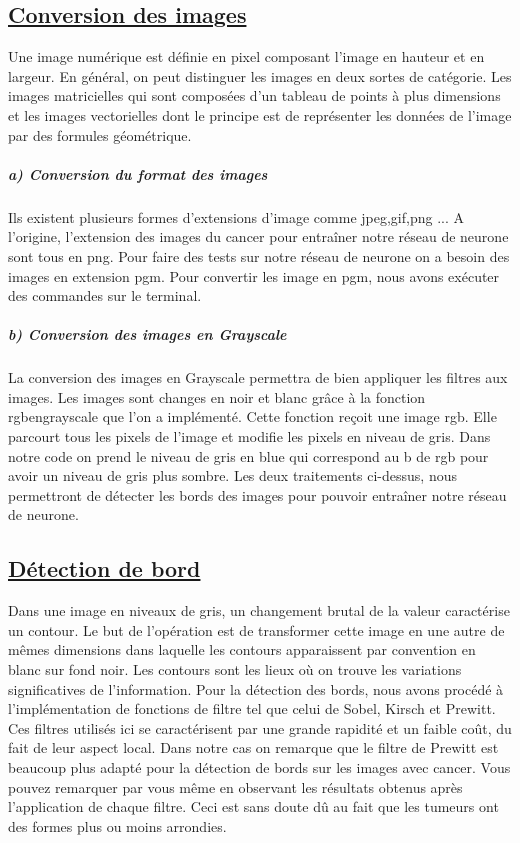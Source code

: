 \documentclass[11pt]{article}
\begin{document}
\subsection{\underline{Conversion des images}}

Une image numérique est définie en pixel composant l’image en hauteur et en largeur. En général, on peut distinguer les images en deux sortes de catégorie. Les images matricielles qui sont composées d’un tableau de points à plus dimensions et les images vectorielles dont le principe est de représenter les données de l’image par des formules géométrique.

\subparagraph{a) Conversion du format des images}

Ils existent plusieurs formes d’extensions d'image comme jpeg,gif,png ... A l'origine, l'extension des images du cancer pour entraîner notre réseau de neurone sont tous en png. Pour faire des tests sur notre réseau de neurone on a besoin des images en extension pgm. Pour convertir les image en pgm, nous avons exécuter des commandes sur le terminal. 

\subparagraph{b) Conversion des images en Grayscale}
La conversion des images en Grayscale permettra de bien appliquer les filtres aux images. Les images sont changes en noir et blanc grâce à la fonction rgbengrayscale que l'on a implémenté. Cette fonction reçoit une image rgb. Elle parcourt tous les pixels de l'image et modifie les pixels en niveau de gris. Dans notre code on prend le niveau de gris en blue qui correspond au b de rgb pour avoir un niveau de gris plus sombre.
Les deux traitements ci-dessus, nous permettront de détecter les bords des images pour pouvoir entraîner notre réseau de neurone.

\subsection{\underline{Détection de bord}}

Dans une image en niveaux de gris, un changement brutal de la valeur caractérise un contour. Le but de l'opération est de transformer cette image en une autre de mêmes dimensions dans laquelle les contours apparaissent par convention en blanc sur fond noir. Les contours sont les lieux où on trouve les variations significatives de l'information. Pour la détection des bords, nous avons procédé à l'implémentation de fonctions de filtre tel que celui de Sobel, Kirsch et Prewitt. Ces filtres utilisés ici se caractérisent par une grande rapidité et un faible coût, du fait de leur aspect local. Dans notre cas on remarque que le filtre de Prewitt est beaucoup plus adapté pour la détection de bords sur les images avec cancer. Vous pouvez remarquer par vous même en observant les résultats obtenus après l'application de chaque filtre. Ceci est sans doute dû au fait que les tumeurs ont des formes plus ou moins arrondies.
\end{document}
